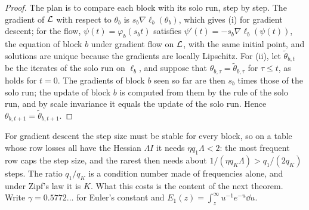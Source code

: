 \begin{refsection}

\begin{proof}
The plan is to compare each block with its solo run, step by step. The gradient of $\mathcal{L}$ with respect to $\theta_b$ is $s_b\nabla\ell_b(\theta_b)$, which gives (i) for gradient descent; for the flow, $\psi(t)=\varphi_b(s_bt)$ satisfies $\psi'(t)=-s_b\nabla\ell_b(\psi(t))$, the equation of block $b$ under gradient flow on $\mathcal{L}$, with the same initial point, and solutions are unique because the gradients are locally Lipschitz. For (ii), let $\tilde\theta_{b,t}$ be the iterates of the solo run on $\ell_b$, and suppose that $\theta_{b,\tau}=\tilde\theta_{b,\tau}$ for $\tau\le t$, as holds for $t=0$. The gradients of block $b$ seen so far are then $s_b$ times those of the solo run; the update of block $b$ is computed from them by the rule of the solo run, and by scale invariance it equals the update of the solo run. Hence $\theta_{b,t+1}=\tilde\theta_{b,t+1}$.
\end{proof}

For gradient descent the step size must be stable for every block, so on a table whose row losses all have the Hessian $\Lambda I$ it needs $\eta q_1\Lambda<2$: the most frequent row caps the step size, and the rarest then needs about $1/(\eta q_K\Lambda)>q_1/(2q_K)$ steps. The ratio $q_1/q_K$ is a condition number made of frequencies alone, and under Zipf's law it is $K$. What this costs is the content of the next theorem. Write $\gamma=0.5772\ldots$ for Euler's constant and $E_1(z)=\int_z^\infty u^{-1}e^{-u}\dd u$.


\end{refsection}

